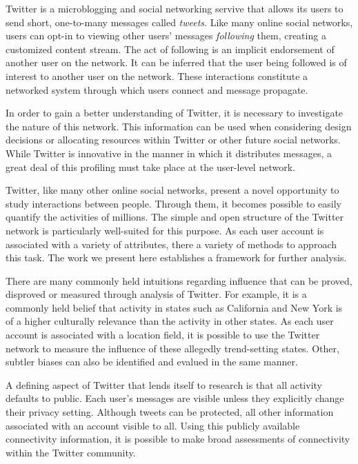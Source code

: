 Twitter is a microblogging and social networking servive that allows its users to send short, one-to-many messages called \textit{tweets}.  Like many online social networks, users can opt-in to viewing other users' messages \textit{following} them, creating a customized content stream.  The act of following is an implicit endorsement of another user on the network.  It can be inferred that the user being followed is of interest to another user on the network.  These interactions constitute a networked system through which users connect and message propagate.

In order to gain a better understanding of Twitter, it is necessary to investigate the nature of this network.  This information can be used when considering design decisions or allocating resources within Twitter or other future social networks.  While Twitter is innovative in the manner in which it distributes messages, a great deal of this profiling must take place at the user-level network.

Twitter, like many other online social networks, present a novel opportunity to study interactions between people.  Through them, it becomes possible to easily quantify the activities of millions.  The simple and open structure of the Twitter network is particularly well-suited for this purpose.  As each user account is associated with a variety of attributes, there a variety of methods to approach this task.  The work we present here establishes a framework for further analysis.

There are many commonly held intuitions regarding influence that can be proved, disproved or measured through analysis of Twitter.  For example, it is a commonly held belief that activity in states such as California and New York is of a higher culturally relevance than the activity in other states.  As each user account is associated with a location field, it is possible to use the Twitter network to measure the influence of these allegedly trend-setting states.  Other, subtler biases can also be identified and evalued in the same manner.

A defining aspect of Twitter that lends itself to research is that all activity defaults to public.  Each user's messages are visible unless they explicitly change their privacy setting.  Although tweets can be protected, all other information associated with an account visible to all.  Using this publicly available connectivity information, it is possible to make broad assessments of connectivity within the Twitter community.

